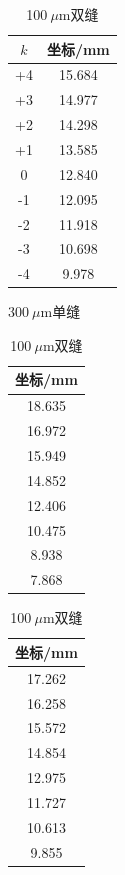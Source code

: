 \documentclass[a4paper]{article}%
\begin{document}
\begin{table}[H]
\begin{minipage}{0.18\linewidth}
\begin{tabular}{cc}
            \toprule
            $k$ & 坐标/mm\\
            \midrule
            +4&15.684\\
            +3&14.977\\
            +2&14.298\\
            +1&13.585\\
            0&12.840\\
            -1&12.095\\
            -2&11.918\\
            -3&10.698\\
            -4&9.978\\
            \bottomrule
        \end{tabular}
        \caption{300$~\mu$m单缝}
    \end{minipage}
    \begin{minipage}{0.14\linewidth}
        \centering
        \begin{tabular}{c}
            \toprule
            坐标/mm\\
            \midrule
            18.635\\
            16.972\\
            15.949\\
            14.852\\
            12.406\\
            10.475\\
            8.938\\
            7.868\\
            \bottomrule
        \end{tabular}
        \caption{100$~\mu$m双缝}
    \end{minipage}
    \begin{minipage}{0.13\linewidth}  
        \centering
        \begin{tabular}{c} 
            \toprule
            坐标/mm\\
            \midrule
            17.262\\
            16.258\\
            15.572\\
            14.854\\
            12.975\\
            11.727\\
            10.613\\
            9.855\\
            \bottomrule
        \end{tabular}

\end{minipage}
\end{table}
\end{document}
